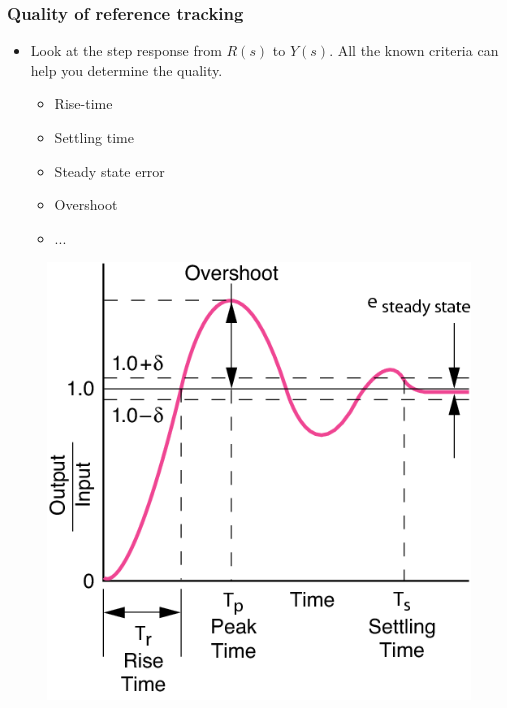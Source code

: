 \begin{frame}
	\frametitle{Quality of reference tracking}
	\begin{minipage}{0.5\linewidth}
		\begin{itemize}
			\item Look at the step response from $R(s)$ to $Y(s)$. All the known criteria can help you determine the quality.
			\begin{itemize}
				\item Rise-time
				\item Settling time
				\item Steady state error
				\item Overshoot
				\item ...
			\end{itemize}
		\end{itemize}
	\end{minipage}
	\hfill
	\begin{minipage}{0.4\linewidth}
		\begin{figure}
			\centering
			\includegraphics[width=1\linewidth]{properties}
			\label{fig:properties}
		\end{figure}
	\end{minipage}
\end{frame}

